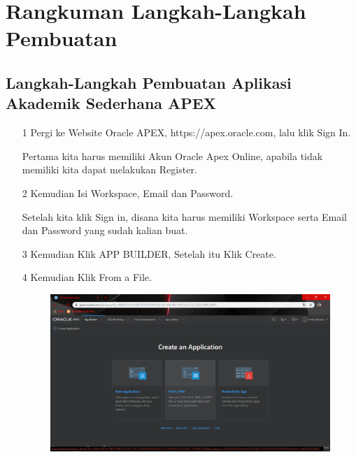 \chapter{Rangkuman Langkah-Langkah Pembuatan}

\section{Langkah-Langkah Pembuatan Aplikasi Akademik Sederhana APEX}

\begin{enumerate}


\item[1]Pergi ke Website Oracle APEX, https://apex.oracle.com, lalu klik Sign In.

\par
Pertama kita harus memiliki Akun Oracle Apex Online, apabila tidak memiliki kita dapat melakukan Register.

\item[2]Kemudian Isi Workspace, Email dan Password.

\par
Setelah kita klik Sign in, disana kita harus memiliki Workspace serta Email dan Password yang sudah kalian buat.

\item[3]Kemudian Klik APP BUILDER, Setelah itu Klik Create.

\par

\item[4]Kemudian Klik From a File.

\begin{figure}[!htbp]
    \begin{center}
    \includegraphics[scale=0.3]{figures/1.png}
    \end{center}   
    \end{figure}


\end{enumerate}
